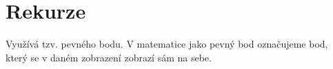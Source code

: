 
\section{Rekurze}

\begin{compactitem}
    \item Využívá tzv. pevného bodu. V matematice jako pevný bod označujeme bod, který se v daném zobrazení zobrazí sám na sebe.
\end{compactitem}

